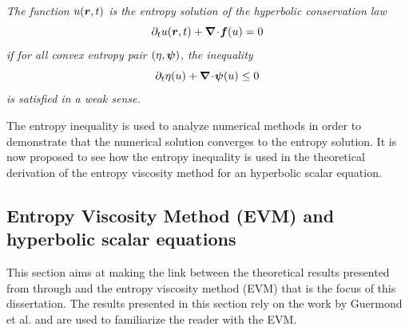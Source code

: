 %
\begin{definition}
\emph{The function $u(\boldsymbol r, t)$ is the entropy solution of the hyperbolic conservation law 
%
\begin{equation}
\partial_t u( \boldsymbol r, t) + \boldsymbol{\nabla}\! \cdot \! \boldsymbol f(u) = 0 \nonumber
\end{equation}
%
if for all convex entropy pair $\left( \eta,\boldsymbol\psi \right)$, the inequality 
%
\begin{equation}
\partial_t \eta (u) + \boldsymbol{\nabla}\! \cdot \! \boldsymbol\psi (u) \leq 0 \nonumber
\end{equation}
%
is satisfied in a weak sense.}
\end{definition}
%
The entropy inequality is used to analyze numerical methods in order to demonstrate that the numerical solution converges to the entropy solution. It is now proposed to see how the entropy inequality is used in the theoretical derivation of the entropy viscosity method for an hyperbolic scalar equation. 

\subsection{Entropy Viscosity Method (EVM) and hyperbolic scalar equations}\label{sec:evm_hyp_sc_sct1b}
This section aims at making the link between the theoretical results presented from  through  and the entropy viscosity method (EVM) that is the focus of this dissertation. The results presented in this section rely on the work by Guermond et al. \cite{jlg1, jlg2, jlg3, valentin} and are used to familiarize the reader with the EVM.

